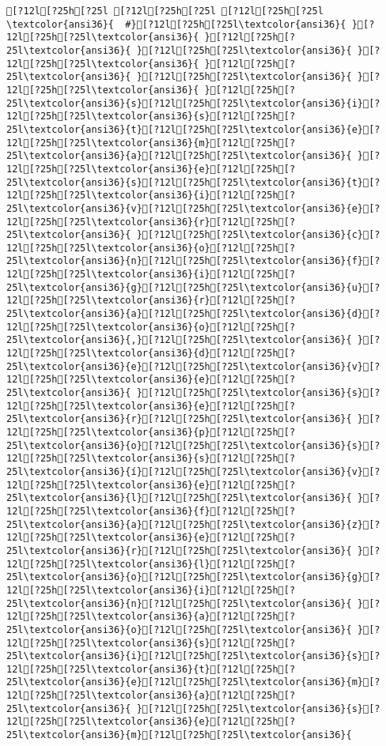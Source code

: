 \documentclass{scrartcl}
\begin{document}
\begin{Verbatim}
[?12l[?25h[?25l [?12l[?25h[?25l [?12l[?25h[?25l
\textcolor{ansi36}{  #}[?12l[?25h[?25l\textcolor{ansi36}{ }[?12l[?25h[?25l\textcolor{ansi36}{ }[?12l[?25h[?25l\textcolor{ansi36}{ }[?12l[?25h[?25l\textcolor{ansi36}{ }[?12l[?25h[?25l\textcolor{ansi36}{ }[?12l[?25h[?25l\textcolor{ansi36}{ }[?12l[?25h[?25l\textcolor{ansi36}{ }[?12l[?25h[?25l\textcolor{ansi36}{ }[?12l[?25h[?25l\textcolor{ansi36}{s}[?12l[?25h[?25l\textcolor{ansi36}{i}[?12l[?25h[?25l\textcolor{ansi36}{s}[?12l[?25h[?25l\textcolor{ansi36}{t}[?12l[?25h[?25l\textcolor{ansi36}{e}[?12l[?25h[?25l\textcolor{ansi36}{m}[?12l[?25h[?25l\textcolor{ansi36}{a}[?12l[?25h[?25l\textcolor{ansi36}{ }[?12l[?25h[?25l\textcolor{ansi36}{e}[?12l[?25h[?25l\textcolor{ansi36}{s}[?12l[?25h[?25l\textcolor{ansi36}{t}[?12l[?25h[?25l\textcolor{ansi36}{i}[?12l[?25h[?25l\textcolor{ansi36}{v}[?12l[?25h[?25l\textcolor{ansi36}{e}[?12l[?25h[?25l\textcolor{ansi36}{r}[?12l[?25h[?25l\textcolor{ansi36}{ }[?12l[?25h[?25l\textcolor{ansi36}{c}[?12l[?25h[?25l\textcolor{ansi36}{o}[?12l[?25h[?25l\textcolor{ansi36}{n}[?12l[?25h[?25l\textcolor{ansi36}{f}[?12l[?25h[?25l\textcolor{ansi36}{i}[?12l[?25h[?25l\textcolor{ansi36}{g}[?12l[?25h[?25l\textcolor{ansi36}{u}[?12l[?25h[?25l\textcolor{ansi36}{r}[?12l[?25h[?25l\textcolor{ansi36}{a}[?12l[?25h[?25l\textcolor{ansi36}{d}[?12l[?25h[?25l\textcolor{ansi36}{o}[?12l[?25h[?25l\textcolor{ansi36}{,}[?12l[?25h[?25l\textcolor{ansi36}{ }[?12l[?25h[?25l\textcolor{ansi36}{d}[?12l[?25h[?25l\textcolor{ansi36}{e}[?12l[?25h[?25l\textcolor{ansi36}{v}[?12l[?25h[?25l\textcolor{ansi36}{e}[?12l[?25h[?25l\textcolor{ansi36}{ }[?12l[?25h[?25l\textcolor{ansi36}{s}[?12l[?25h[?25l\textcolor{ansi36}{e}[?12l[?25h[?25l\textcolor{ansi36}{r}[?12l[?25h[?25l\textcolor{ansi36}{ }[?12l[?25h[?25l\textcolor{ansi36}{p}[?12l[?25h[?25l\textcolor{ansi36}{o}[?12l[?25h[?25l\textcolor{ansi36}{s}[?12l[?25h[?25l\textcolor{ansi36}{s}[?12l[?25h[?25l\textcolor{ansi36}{í}[?12l[?25h[?25l\textcolor{ansi36}{v}[?12l[?25h[?25l\textcolor{ansi36}{e}[?12l[?25h[?25l\textcolor{ansi36}{l}[?12l[?25h[?25l\textcolor{ansi36}{ }[?12l[?25h[?25l\textcolor{ansi36}{f}[?12l[?25h[?25l\textcolor{ansi36}{a}[?12l[?25h[?25l\textcolor{ansi36}{z}[?12l[?25h[?25l\textcolor{ansi36}{e}[?12l[?25h[?25l\textcolor{ansi36}{r}[?12l[?25h[?25l\textcolor{ansi36}{ }[?12l[?25h[?25l\textcolor{ansi36}{l}[?12l[?25h[?25l\textcolor{ansi36}{o}[?12l[?25h[?25l\textcolor{ansi36}{g}[?12l[?25h[?25l\textcolor{ansi36}{i}[?12l[?25h[?25l\textcolor{ansi36}{n}[?12l[?25h[?25l\textcolor{ansi36}{ }[?12l[?25h[?25l\textcolor{ansi36}{a}[?12l[?25h[?25l\textcolor{ansi36}{o}[?12l[?25h[?25l\textcolor{ansi36}{ }[?12l[?25h[?25l\textcolor{ansi36}{s}[?12l[?25h[?25l\textcolor{ansi36}{i}[?12l[?25h[?25l\textcolor{ansi36}{s}[?12l[?25h[?25l\textcolor{ansi36}{t}[?12l[?25h[?25l\textcolor{ansi36}{e}[?12l[?25h[?25l\textcolor{ansi36}{m}[?12l[?25h[?25l\textcolor{ansi36}{a}[?12l[?25h[?25l\textcolor{ansi36}{ }[?12l[?25h[?25l\textcolor{ansi36}{s}[?12l[?25h[?25l\textcolor{ansi36}{e}[?12l[?25h[?25l\textcolor{ansi36}{m}[?12l[?25h[?25l\textcolor{ansi36}{ 
\end{Verbatim}
\end{document}
